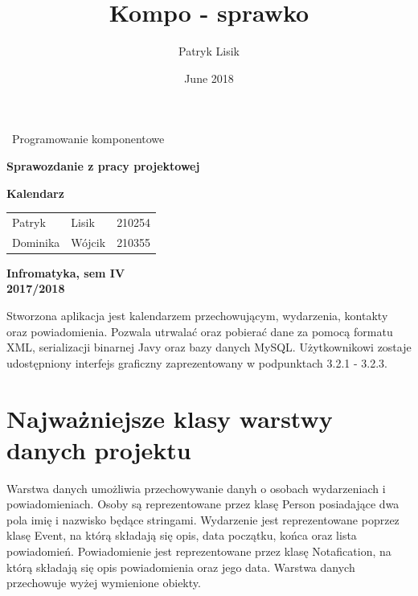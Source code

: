 \documentclass[a4paper,12pt]{article}
\title{Kompo - sprawko}
\author{Patryk Lisik}
\date{June 2018}
\begin{document}
\begin{titlepage}
\vspace{10cm}


\centering
{\center\huge\ Programowanie komponentowe \par}
\vspace{1.5cm}
{\center\huge\bfseries Sprawozdanie z pracy projektowej  \par}
\vspace{1.5cm}
{\center\huge\bfseries Kalendarz}

\vspace{6cm}


\begin{flushright}
\begin{tabular}{lll}
Patryk & Lisik & 210254 \\ 
Dominika & Wójcik  & 210355 \\ 
\end{tabular} 
\end{flushright}

\vspace{5cm}

\begin{center}
\textbf{Infromatyka, sem IV \\}
\textbf{2017/2018}
\end{center}
 

\end{titlepage}

Stworzona aplikacja jest kalendarzem przechowującym, wydarzenia, kontakty oraz powiadomienia. Pozwala utrwalać oraz pobierać dane za pomocą formatu XML, serializacji binarnej Javy oraz bazy danych MySQL. Użytkownikowi zostaje udostępniony interfejs graficzny zaprezentowany w podpunktach 3.2.1 -  3.2.3. 
       
\section{Najważniejsze klasy warstwy danych projektu}
Warstwa danych umożliwia przechowywanie danyh o osobach wydarzeniach i powiadomieniach. Osoby są reprezentowane przez klasę Person posiadające dwa pola imię i nazwisko będące stringami. Wydarzenie jest reprezentowane poprzez klasę Event, na którą składają się opis, data początku, końca oraz lista powiadomień. Powiadomienie jest reprezentowane przez klasę Notafication, na którą składają się opis powiadomienia oraz jego data. 
Warstwa danych przechowuje wyżej wymienione obiekty. 
\end{document}
